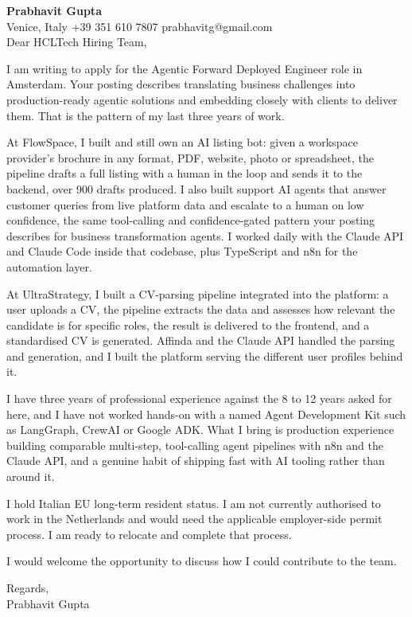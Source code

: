 \documentclass[a4paper,10.5pt]{article}
\begin{document}
\textbf{Prabhavit Gupta}\\
Venice, Italy \textbar{} +39 351 610 7807 \textbar{} prabhavitg@gmail.com\\[10pt]
Dear HCLTech Hiring Team,

I am writing to apply for the Agentic Forward Deployed Engineer role in Amsterdam. Your posting describes translating business challenges into production-ready agentic solutions and embedding closely with clients to deliver them. That is the pattern of my last three years of work.

At FlowSpace, I built and still own an AI listing bot: given a workspace provider's brochure in any format, PDF, website, photo or spreadsheet, the pipeline drafts a full listing with a human in the loop and sends it to the backend, over 900 drafts produced. I also built support AI agents that answer customer queries from live platform data and escalate to a human on low confidence, the same tool-calling and confidence-gated pattern your posting describes for business transformation agents. I worked daily with the Claude API and Claude Code inside that codebase, plus TypeScript and n8n for the automation layer.

At UltraStrategy, I built a CV-parsing pipeline integrated into the platform: a user uploads a CV, the pipeline extracts the data and assesses how relevant the candidate is for specific roles, the result is delivered to the frontend, and a standardised CV is generated. Affinda and the Claude API handled the parsing and generation, and I built the platform serving the different user profiles behind it.

I have three years of professional experience against the 8 to 12 years asked for here, and I have not worked hands-on with a named Agent Development Kit such as LangGraph, CrewAI or Google ADK. What I bring is production experience building comparable multi-step, tool-calling agent pipelines with n8n and the Claude API, and a genuine habit of shipping fast with AI tooling rather than around it.

I hold Italian EU long-term resident status. I am not currently authorised to work in the Netherlands and would need the applicable employer-side permit process. I am ready to relocate and complete that process.

I would welcome the opportunity to discuss how I could contribute to the team.

Regards,\\
Prabhavit Gupta
\end{document}
